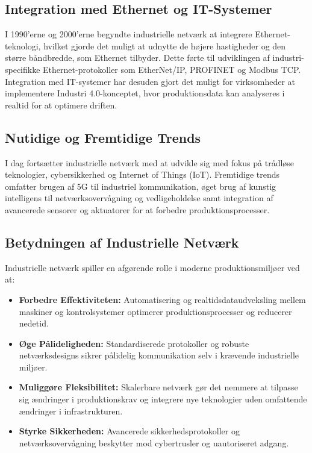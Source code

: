 \subsection{Integration med Ethernet og IT-Systemer}
I 1990'erne og 2000'erne begyndte industrielle netværk at integrere Ethernet-teknologi, hvilket gjorde det muligt at udnytte de højere hastigheder og den større båndbredde, som Ethernet tilbyder. Dette førte til udviklingen af industri-specifikke Ethernet-protokoller som EtherNet/IP, PROFINET og Modbus TCP. Integration med IT-systemer har desuden gjort det muligt for virksomheder at implementere Industri 4.0-konceptet, hvor produktionsdata kan analyseres i realtid for at optimere driften.

\subsection{Nutidige og Fremtidige Trends}
I dag fortsætter industrielle netværk med at udvikle sig med fokus på trådløse teknologier, cybersikkerhed og Internet of Things (IoT). Fremtidige trends omfatter brugen af 5G til industriel kommunikation, øget brug af kunstig intelligens til netværksovervågning og vedligeholdelse samt integration af avancerede sensorer og aktuatorer for at forbedre produktionsprocesser.

\subsection{Betydningen af Industrielle Netværk}
Industrielle netværk spiller en afgørende rolle i moderne produktionsmiljøer ved at:
\begin{itemize}
	\item \textbf{Forbedre Effektiviteten:} Automatisering og realtidsdataudveksling mellem maskiner og kontrolsystemer optimerer produktionsprocesser og reducerer nedetid.
	\item \textbf{Øge Pålideligheden:} Standardiserede protokoller og robuste netværksdesigns sikrer pålidelig kommunikation selv i krævende industrielle miljøer.
	\item \textbf{Muliggøre Fleksibilitet:} Skalerbare netværk gør det nemmere at tilpasse sig ændringer i produktionskrav og integrere nye teknologier uden omfattende ændringer i infrastrukturen.
	\item \textbf{Styrke Sikkerheden:} Avancerede sikkerhedsprotokoller og netværksovervågning beskytter mod cybertrusler og uautoriseret adgang.
\end{itemize}


